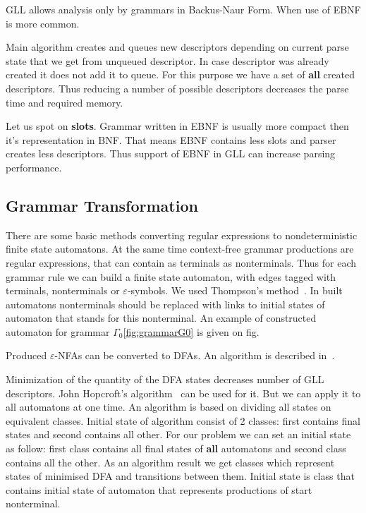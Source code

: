 \documentclass[runningheads,a4paper]{llncs}
\begin{document}
GLL allows analysis only by grammars in Backus-Naur Form. When use of EBNF is more common.

Main algorithm creates and queues new descriptors depending on current parse state that we get from unqueued descriptor. 
In case descriptor was already created it does not add it to queue. For this purpose we have a set of
\textbf{all} created descriptors. Thus reducing a number of possible descriptors decreases the parse time
and required memory.

Let us spot on \textbf{slots}. Grammar written in EBNF is usually more compact then it's representation in BNF. That means EBNF contains 
less slots and parser creates less descriptors. Thus support of EBNF in GLL can increase parsing performance. 


\subsection{Grammar Transformation}%

There are some basic methods converting regular expressions to nondeterministic finite state automatons. 
At the same time context-free grammar productions are regular expressions, that can contain as terminals 
as nonterminals. Thus for each grammar rule we can build a finite state automaton, with edges tagged with 
terminals, nonterminals or $\varepsilon$-symbols. We used Thompson's method~\cite{Thompson:1968:PTR:363347.363387}. 
In built automatons nonterminals should be replaced with links to initial states of automaton that stands 
for this nonterminal. An example of constructed automaton for grammar $\Gamma_{0}$\ref{fig:grammarG0} is given on fig.

Produced $\varepsilon$-NFAs can be converted to DFAs. An algorithm is described in~\cite{aho1974design}.

Minimization of the quantity of the DFA states decreases number of GLL descriptors. John Hopcroft's 
algorithm~\cite{hopcroft1971n} can be used for it. But we can apply it to all automatons at one time. 
An algorithm is based on dividing all states on equivalent classes. Initial state of algorithm consist 
of 2 classes: first contains final states and second contains all other. For our problem we can set an 
initial state as follow: first class contains all final states of \textbf{all} automatons and second class 
contains all the other. As an algorithm result we get classes which represent states of minimised DFA and 
transitions between them.
Initial state is class that contains initial state of automaton that represents productions of start nonterminal.
\end{document}

